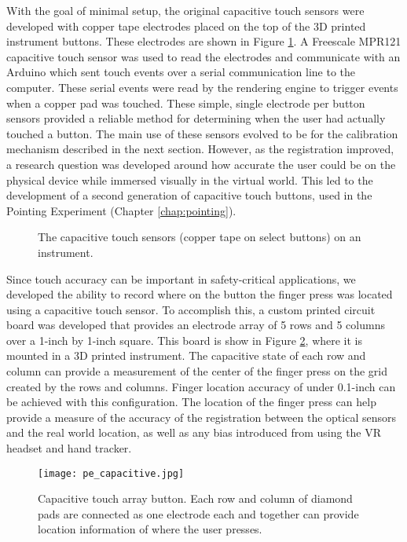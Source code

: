 With the goal of minimal setup, the original capacitive touch sensors were developed with copper tape electrodes placed on the top of the 3D printed instrument buttons.
These electrodes are shown in Figure \ref{fig:proto_mfd_capacitive}.
A Freescale MPR121 capacitive touch sensor was used to read the electrodes and communicate with an Arduino which sent touch events over a serial communication line to the computer.
These serial events were read by the rendering engine to trigger events when a copper pad was touched.
These simple, single electrode per button sensors provided a reliable method for determining when the user had actually touched a button.
The main use of these sensors evolved to be for the calibration mechanism described in the next section.
However, as the registration improved, a research question was developed around how accurate the user could be on the physical device while immersed visually in the virtual world.
This led to the development of a second generation of capacitive touch buttons, used in the Pointing Experiment (Chapter \ref{chap:pointing}).

\begin{figure}
    \centering
    \caption{The capacitive touch sensors (copper tape on select buttons) on an instrument.}
    \label{fig:proto_mfd_capacitive}
\end{figure}

Since touch accuracy can be important in safety-critical applications, we developed the ability to record where on the button the finger press was located using a capacitive touch sensor.
To accomplish this, a custom printed circuit board was developed that provides an electrode array of 5 rows and 5 columns over a 1-inch by 1-inch square.
This board is show in Figure \ref{fig:proto_capacitive_array}, where it is mounted in a 3D printed instrument.
The capacitive state of each row and column can provide a measurement of the center of the finger press on the grid created by the rows and columns.
Finger location accuracy of under 0.1-inch can be achieved with this configuration.
The location of the finger press can help provide a measure of the accuracy of the registration between the optical sensors and the real world location, as well as any bias introduced from using the VR headset and hand tracker.

\begin{figure}
    \centering
    \texttt{[image: pe\_capacitive.jpg]}
    \caption{Capacitive touch array button. Each row and column of diamond pads are connected as one electrode each and together can provide location information of where the user presses.}
    \label{fig:proto_capacitive_array}
\end{figure}


